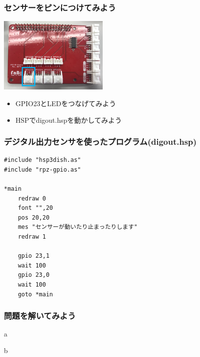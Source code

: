 \begin{frame}
    \frametitle{センサーをピンにつけてみよう}
    \begin{center}
        \includegraphics[width=0.4\textwidth]{images/chap05/text05-img027.png}
        \begin{itemize}
            \item GPIO23とLEDをつなげてみよう
            \item HSPでdigout.hspを動かしてみよう
        \end{itemize}
    \end{center}
\end{frame}

\begin{frame}[fragile]
    \frametitle{デジタル出力センサを使ったプログラム(digout.hsp)}
\begin{lstlisting}
#include "hsp3dish.as"
#include "rpz-gpio.as"

*main
    redraw 0
    font "",20
    pos 20,20
    mes "センサーが動いたり止まったりします"
    redraw 1

    gpio 23,1
    wait 100
    gpio 23,0
    wait 100
    goto *main
\end{lstlisting}
\end{frame}

\begin{frame}[fragile]
    \frametitle{問題を解いてみよう}
    \begin{description}
        \item a
        \item b
    \end{description}
\end{frame}